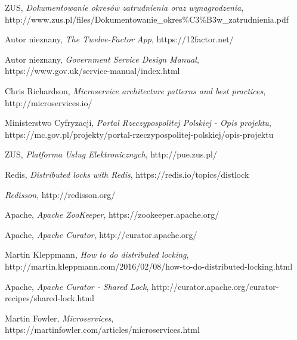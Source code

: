 \documentclass[licencjacka]{pracamgr}
\begin{document}
\begin{thebibliography}{99}

 ZUS, \textit{Dokumentowanie okresów zatrudnienia oraz
	wynagrodzenia}, http://www.zus.pl/files/Dokumentowanie\_okres\%C3\%B3w\_zatrudnienia.pdf

 Autor nieznany, \textit{The Twelve-Factor App}, https://12factor.net/

 Autor nieznany, \textit{Government Service Design Manual},
https://www.gov.uk/service-manual/index.html

 Chris Richardson, \textit{Microservice architecture patterns and best practices},
http://microservices.io/

 Ministerstwo Cyfryzacji, \textit{Portal Rzeczypospolitej Polskiej - Opis projektu},
https://mc.gov.pl/projekty/portal-rzeczypospolitej-polskiej/opis-projektu

 ZUS, \textit{Platforma Usług Elektronicznych},
http://pue.zus.pl/

 Redis, \textit{Distributed locks with Redis},
https://redis.io/topics/distlock

 \textit{Redisson},
http://redisson.org/

 Apache, \textit{Apache ZooKeeper},
https://zookeeper.apache.org/

 Apache, \textit{Apache Curator},
http://curator.apache.org/

 Martin Kleppmann, \textit{How to do distributed locking},
http://martin.kleppmann.com/2016/02/08/how-to-do-distributed-locking.html

 Apache, \textit{Apache Curator - Shared Lock},
http://curator.apache.org/curator-recipes/shared-lock.html

 Martin Fowler, \textit{Microservices},
https://martinfowler.com/articles/microservices.html

\end{thebibliography}
\end{document}
